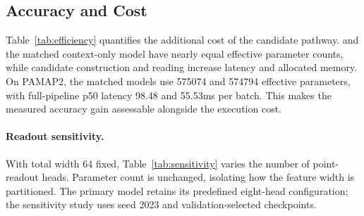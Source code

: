 \subsection{Accuracy and Cost}
Table~\ref{tab:efficiency} quantifies the additional cost of the candidate pathway. \Model{} and the matched context-only model have nearly equal effective parameter counts, while candidate construction and reading increase latency and allocated memory. On PAMAP2, the matched models use 575074 and 574794 effective parameters, with full-pipeline p50 latency 98.48 and 55.53ms per batch. This makes the measured accuracy gain assessable alongside the execution cost.

\begin{table}[t]
 \centering\small\setlength{\tabcolsep}{3pt}
 
 \caption{Inference cost of selected seed 2023 models on the same exclusive RTX5090, FP32, batch 128. Median latency follows twenty warm-ups and one hundred synchronized measurements. VRAM denotes peak allocated memory.}
 \label{tab:efficiency}
\end{table}

\paragraph{Readout sensitivity.}
With total width 64 fixed, Table~\ref{tab:sensitivity} varies the number of point-readout heads. Parameter count is unchanged, isolating how the feature width is partitioned. The primary model retains its predefined eight-head configuration; the sensitivity study uses seed 2023 and validation-selected checkpoints.

\begin{table}[t]
 \centering\small\setlength{\tabcolsep}{3pt}
 
 \caption{Point-readout head sensitivity on ETTh1$(.10,16)$, width 64, seed 2023 and twenty shared test masks.}
 \label{tab:sensitivity}
\end{table}
